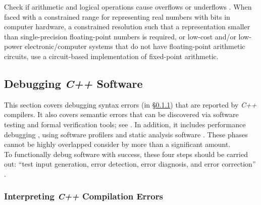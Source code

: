 	Check if arithmetic and logical operations cause overflows or underflows \cite{Crowl2015,Crowl2012}. When faced with a constrained range for representing real numbers with bits in computer hardware, a constrained resolution such that a representation smaller than single-precision floating-point numbers is required, or low-cost and/or low-power electronic/computer systems that do not have floating-point arithmetic circuits, use a circuit-based implementation of fixed-point arithmetic.



\subsection{Debugging {\it C++} Software}
\label{ssec:DebuggingCppSoftware}

	This section covers debugging syntax errors (in \S\ref{sssec:InterpretingCppCompilationErrors}) that are reported by {\it C++} compilers. It also covers semantic errors that can be discovered via software testing and formal verification tools; see \cite[\S4.4, pp. 119]{Pradhan2009}. In addition, it includes performance debugging \cite[\S4.5, pp. 119--120]{Pradhan2009}, using software profilers \cite[Figure 7.1, pp. 292; and \S7.2.10, pp. 302]{Fisher2005} \cite[pp. 148]{Kernighan1999} \cite[pp. 35-9 -- 35-10]{Lee2008b} \cite[\S3.2, pp. 16--18]{Fog2014c} \cite[\S3.3.2, pp. 21--22; pp. 23; Figure 40, pp. 102; Appendix C, \S C.1.7, pp. 104]{Baik2013} and static analysis software \cite[\S5.4, 65-66; and Figure 40, pp. 102]{Baik2013} \cite{Adve1997} \cite[\S7.1, 176--183]{Bailey2007} \cite[\S5.2.4, pp. 82--83; and \S5.4.2, pp. 90--92]{Debbabi2010} \cite[Chapter 7, pp. 109--117]{Ford2008} \cite[\S35.5, pp. 35-10 -- 35-14]{Lee2008b} \cite{Boulanger2013}. These phases cannot be highly overlapped consider by more than a significant amount.
\ \\

	To  functionally debug software with success, these four steps should be carried out: ``test input generation, error detection, error diagnosis, and error correction'' \cite{Kirovski1997}. 
	
	

\subsubsection{Interpreting {\it C++} Compilation Errors}
\label{sssec:InterpretingCppCompilationErrors}

